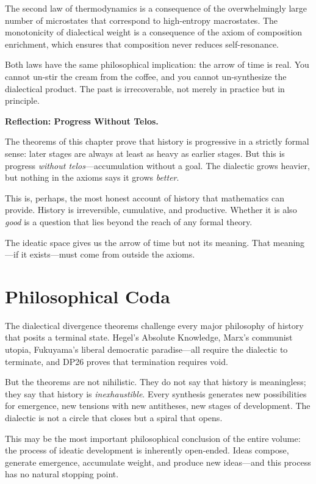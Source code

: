 The second law of thermodynamics is a consequence of the overwhelmingly
large number of microstates that correspond to high-entropy macrostates.
The monotonicity of dialectical weight is a consequence of the axiom
of composition enrichment, which ensures that composition never
reduces self-resonance.

Both laws have the same philosophical implication: the arrow of time
is real.  You cannot un-stir the cream from the coffee, and you cannot
un-synthesize the dialectical product.  The past is irrecoverable,
not merely in practice but in principle.

\begin{reflectionbox}
\noindent\textbf{Reflection: Progress Without Telos.}

The theorems of this chapter prove that history is progressive in a
strictly formal sense: later stages are always at least as heavy as
earlier stages.  But this is progress \emph{without telos}---accumulation
without a goal.  The dialectic grows heavier, but nothing in the axioms
says it grows \emph{better}.

This is, perhaps, the most honest account of history that mathematics
can provide.  History is irreversible, cumulative, and productive.
Whether it is also \emph{good} is a question that lies beyond the reach
of any formal theory.

The ideatic space gives us the arrow of time but not its meaning.
That meaning---if it exists---must come from outside the axioms.
\end{reflectionbox}

\section{Philosophical Coda}

The dialectical divergence theorems challenge every major philosophy
of history that posits a terminal state.  Hegel's Absolute Knowledge,
Marx's communist utopia, Fukuyama's liberal democratic paradise---all
require the dialectic to terminate, and DP26 proves that termination
requires void.

But the theorems are not nihilistic.  They do not say that history is
meaningless; they say that history is \emph{inexhaustible}.  Every
synthesis generates new possibilities for emergence, new tensions with
new antitheses, new stages of development.  The dialectic is not a
circle that closes but a spiral that opens.

This may be the most important philosophical conclusion of the entire
volume: the process of ideatic development is inherently open-ended.
Ideas compose, generate emergence, accumulate weight, and produce new
ideas---and this process has no natural stopping point.

